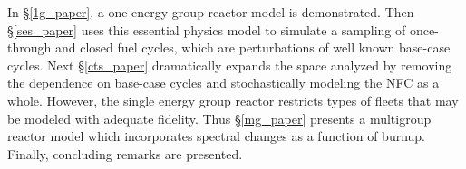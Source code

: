 In \S \ref{1g_paper}, a one-energy group reactor model is demonstrated.  Then \S \ref{ses_paper}
uses this essential physics model to simulate a sampling of once-through and closed fuel cycles,
which are perturbations of well known base-case cycles.  Next \S \ref{cts_paper} dramatically
expands the space analyzed by removing the dependence on base-case cycles and stochastically 
modeling the NFC as a whole.  However, the single energy group reactor restricts types of fleets
that may be modeled with adequate fidelity.  Thus \S \ref{mg_paper} presents a multigroup reactor
model which incorporates spectral changes as a function of burnup.  Finally, concluding remarks
are presented.

